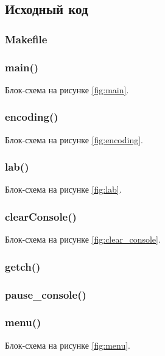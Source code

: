 \documentclass[12pt, a4paper]{article}
\begin{document}
\subsection{Исходный код}

\subsubsection{Makefile}


\subsubsection{main()}
Блок-схема на рисунке \ref{fig:main}.



\subsubsection{encoding()}
Блок-схема на рисунке \ref{fig:encoding}.



\subsubsection{lab()}
Блок-схема на рисунке \ref{fig:lab}.



\subsubsection{clearConsole()}
Блок-схема на рисунке \ref{fig:clear_console}.



\subsubsection{getch()}



\subsubsection{pause\_console()}



\subsubsection{menu()}
Блок-схема на рисунке \ref{fig:menu}.


\end{document}
